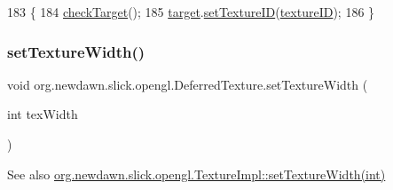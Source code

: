 \begin{DoxyCode}
183                                             \{
184         \mbox{\hyperlink{classorg_1_1newdawn_1_1slick_1_1opengl_1_1_deferred_texture_a22f14bcd9cbd4bf033e2308b90464dce}{checkTarget}}();
185         \mbox{\hyperlink{classorg_1_1newdawn_1_1slick_1_1opengl_1_1_deferred_texture_aa70a4b195d0b965a0099d0e7bc18d9d2}{target}}.\mbox{\hyperlink{classorg_1_1newdawn_1_1slick_1_1opengl_1_1_texture_impl_a776b00222b3ba2c3e05483ca925c382c}{setTextureID}}(\mbox{\hyperlink{classorg_1_1newdawn_1_1slick_1_1opengl_1_1_texture_impl_a6dba48b815f4fc5a37e9c4390f349c9e}{textureID}});
186     \}
\end{DoxyCode}
\mbox{\label{classorg_1_1newdawn_1_1slick_1_1opengl_1_1_deferred_texture_aae63926f3aba1115a921a477871f9efd}} 
\subsubsection{\texorpdfstring{set\+Texture\+Width()}{setTextureWidth()}}
{\footnotesize\ttfamily void org.\+newdawn.\+slick.\+opengl.\+Deferred\+Texture.\+set\+Texture\+Width (\begin{DoxyParamCaption}\item[{int}]{tex\+Width }\end{DoxyParamCaption})\hspace{0.3cm}{\ttfamily [inline]}}

\begin{DoxySeeAlso}{See also}
\mbox{\hyperlink{classorg_1_1newdawn_1_1slick_1_1opengl_1_1_texture_impl_a5bc77da717bc19ad2bfff9c873919719}{org.\+newdawn.\+slick.\+opengl.\+Texture\+Impl\+::set\+Texture\+Width(int)}} 
\end{DoxySeeAlso}

